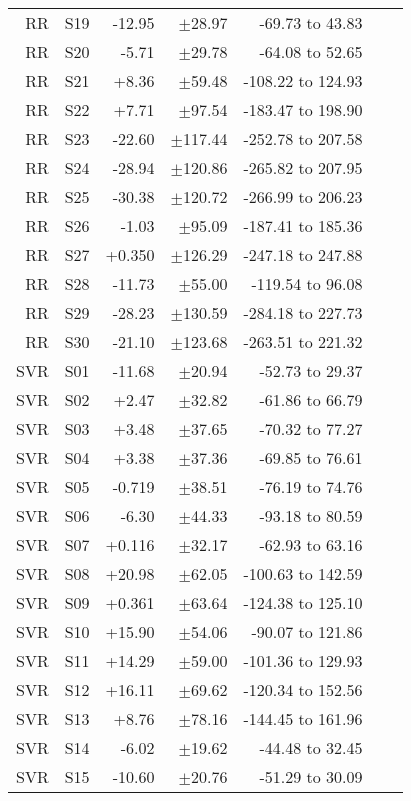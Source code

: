 \begin{table}
\begin{tabular}{rrrrrrr}
   RR &  S19 & -12.95 &  $\pm$28.97 &   -69.73 to 43.83 \\
   RR &  S20 &  -5.71 &  $\pm$29.78 &   -64.08 to 52.65 \\
   RR &  S21 &  +8.36 &  $\pm$59.48 & -108.22 to 124.93 \\
   RR &  S22 &  +7.71 &  $\pm$97.54 & -183.47 to 198.90 \\
   RR &  S23 & -22.60 & $\pm$117.44 & -252.78 to 207.58 \\
   RR &  S24 & -28.94 & $\pm$120.86 & -265.82 to 207.95 \\
   RR &  S25 & -30.38 & $\pm$120.72 & -266.99 to 206.23 \\
   RR &  S26 &  -1.03 &  $\pm$95.09 & -187.41 to 185.36 \\
   RR &  S27 & +0.350 & $\pm$126.29 & -247.18 to 247.88 \\
   RR &  S28 & -11.73 &  $\pm$55.00 &  -119.54 to 96.08 \\
   RR &  S29 & -28.23 & $\pm$130.59 & -284.18 to 227.73 \\
   RR &  S30 & -21.10 & $\pm$123.68 & -263.51 to 221.32 \\
  SVR &  S01 & -11.68 &  $\pm$20.94 &   -52.73 to 29.37 \\
  SVR &  S02 &  +2.47 &  $\pm$32.82 &   -61.86 to 66.79 \\
  SVR &  S03 &  +3.48 &  $\pm$37.65 &   -70.32 to 77.27 \\
  SVR &  S04 &  +3.38 &  $\pm$37.36 &   -69.85 to 76.61 \\
  SVR &  S05 & -0.719 &  $\pm$38.51 &   -76.19 to 74.76 \\
  SVR &  S06 &  -6.30 &  $\pm$44.33 &   -93.18 to 80.59 \\
  SVR &  S07 & +0.116 &  $\pm$32.17 &   -62.93 to 63.16 \\
  SVR &  S08 & +20.98 &  $\pm$62.05 & -100.63 to 142.59 \\
  SVR &  S09 & +0.361 &  $\pm$63.64 & -124.38 to 125.10 \\
  SVR &  S10 & +15.90 &  $\pm$54.06 &  -90.07 to 121.86 \\
  SVR &  S11 & +14.29 &  $\pm$59.00 & -101.36 to 129.93 \\
  SVR &  S12 & +16.11 &  $\pm$69.62 & -120.34 to 152.56 \\
  SVR &  S13 &  +8.76 &  $\pm$78.16 & -144.45 to 161.96 \\
  SVR &  S14 &  -6.02 &  $\pm$19.62 &   -44.48 to 32.45 \\
  SVR &  S15 & -10.60 &  $\pm$20.76 &   -51.29 to 30.09 \\

\end{tabular}
\end{table}
